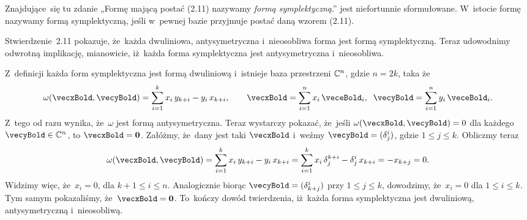 \documentclass[a4paper,11pt]{article}
\numberwithin{equation}{section}
\begin{document}
\VerSpaceFour





\noindent
{} Znajdujące~się tu zdanie „Formę mającą postać
(2.11) nazywamy \textit{formą symplektyczną}.” jest niefortunnie
sformułowane.
W~istocie formę nazywamy formą symplektyczną, jeśli w~pewnej bazie
przyjmuje postać daną wzorem (2.11).

Stwierdzenie~2.11 pokazuje, że~każda dwuliniowa, antysymetryczna
i~nieosobliwa forma jest formą symplektyczną. Teraz udowodnimy odwrotną
implikację, mianowicie, iż~każda forma symplektyczna jest antysymetryczna
i~nieosobliwa.

Z~definicji każda form symplektyczna jest formą dwuliniową i~istnieje baza
przestrzeni $\mathbb{C}^{ n }$, gdzie $n = 2k$, taka że
\begin{equation}
  \label{eq:Wojtynski-26}
  \omega( \vecxBold, \vecyBold ) =
  \sum_{ i = 1 }^{ k } x_{ i } \, y_{ k + i } - y_{ i } \, x_{ k + i }, \qquad
  \vecxBold = \sum_{ i = 1 }^{ n } x_{ i } \, \veceBold_{ i }, \;\;
  \vecyBold = \sum_{ i = 1 }^{ n } y_{ i } \, \veceBold_{ i }.
\end{equation}
Z~tego od razu wynika, że~$\omega$ jest formą antysymetryczna. Teraz wystarczy
pokazać, że~jeśli $\omega( \vecxBold, \vecyBold ) = 0$ dla każdego
$\vecyBold \in \Cbb^{ n }$, to $\vecxBold = \vecZeroBold$. Załóżmy, że~dany
jest taki $\vecxBold$ i~weźmy $\vecyBold = ( \delta^{ i }_{ j } )$, gdzie
$1 \leq j \leq k$. Obliczmy teraz
\begin{equation}
  \label{eq:Wojtynski-27}
  \omega( \vecxBold, \vecyBold ) =
  \sum_{ i = 1 }^{ k } x_{ i } \, y_{ k + i } - y_{ i } \, x_{ k + i } =
  \sum_{ i = 1 }^{ k } x_{ i } \, \delta^{ k + i }_{ j } - \delta^{ i }_{ j } \, x_{ k + i } =
  -x_{ k + j } = 0.
\end{equation}
Widzimy więc, że~$x_{ i } = 0$, dla $k + 1 \leq i \leq n$. Analogicznie biorąc
$\vecyBold = ( \delta^{ i }_{ k + j } )$ przy $1 \leq j \leq k$, dowodzimy,
że~$x_{ i } = 0$ dla $1 \leq i \leq k$. Tym samym pokazaliśmy,
że~$\vecxBold = \vecZeroBold$. To~kończy dowód twierdzenia, iż~każda forma
symplektyczna jest dwuliniową, antysymetryczną i~nieosobliwą.

\VerSpaceFour
\end{document}
